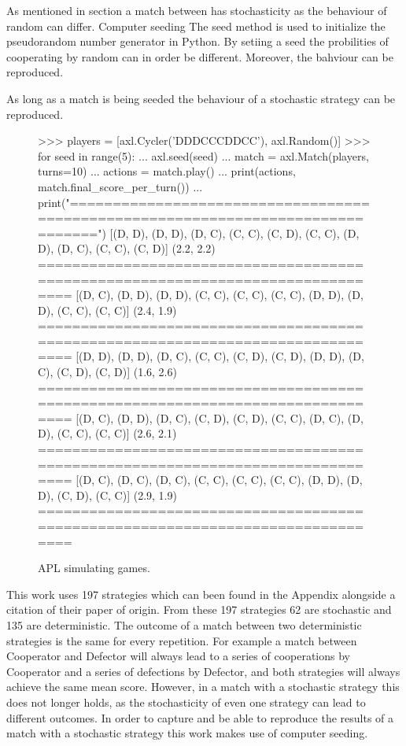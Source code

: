 As mentioned in section a match between has stochasticity as the behaviour of
random can differ. Computer seeding The seed method is used to initialize the
pseudorandom number generator in Python. By setiing a seed the probilities
of cooperating by random can in order be different. Moreover, the bahviour
can be reproduced.

As long as a match is being seeded the behaviour of a stochastic strategy can be
reproduced.
\begin{figure}[!htbp]
    \begin{usagepy}
>>> players = [axl.Cycler('DDDCCCDDCC'), axl.Random()]
>>> for seed in range(5):
...   axl.seed(seed)
...   match = axl.Match(players, turns=10)
...   actions = match.play()
...   print(actions, match.final_score_per_turn())
...   print("================================================================================")
[(D, D), (D, D), (D, C), (C, C), (C, D), (C, C), (D, D), (D, C), (C, C), (C, D)] (2.2, 2.2)
================================================================================
[(D, C), (D, D), (D, D), (C, C), (C, C), (C, C), (D, D), (D, D), (C, C), (C, C)] (2.4, 1.9)
================================================================================
[(D, D), (D, D), (D, C), (C, C), (C, D), (C, D), (D, D), (D, C), (C, D), (C, D)] (1.6, 2.6)
================================================================================
[(D, C), (D, D), (D, C), (C, D), (C, D), (C, C), (D, C), (D, D), (C, C), (C, C)] (2.6, 2.1)
================================================================================
[(D, C), (D, C), (D, C), (C, C), (C, C), (C, C), (D, D), (D, D), (C, D), (C, C)] (2.9, 1.9)
================================================================================
    \end{usagepy}
\caption{APL simulating games.}
\end{figure}

This work uses 197 strategies which can been found in the Appendix alongside a
citation of their paper of origin. From these 197 strategies 62 are stochastic
and 135 are deterministic. The outcome of a match between two deterministic
strategies is the same for every repetition. For example a match between
Cooperator and Defector will always lead to a series of cooperations by
Cooperator and a series of defections by Defector, and both strategies will
always achieve the same mean score. However, in a match with a stochastic
strategy this does not longer holds, as the stochasticity of even one strategy
can lead to different outcomes. In order to capture and be able to reproduce the
results of a match with a stochastic strategy this work makes use of computer
seeding.

